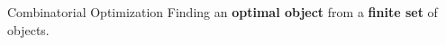\begin{frame}{Combinatorial Optimization}
\Huge Finding an \textbf{optimal object} from a \textbf{finite set} of objects.
\end{frame}